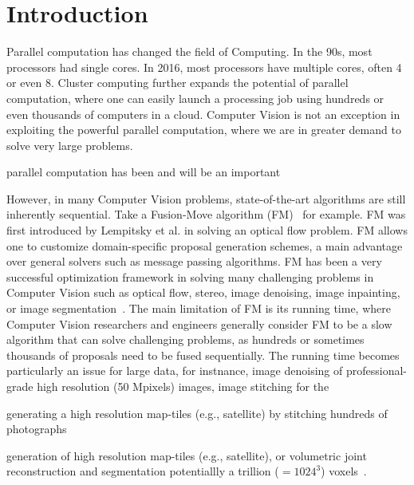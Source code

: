 \section{Introduction}
Parallel computation has changed the field of Computing.  In the 90s,
most processors had single cores. In 2016, most processors have multiple
cores, often 4 or even 8. Cluster computing further expands the
potential of parallel computation, where one can easily launch a
processing job using hundreds or even thousands of computers in a
cloud. Computer Vision is not an exception in exploiting the powerful
parallel computation, where we are in greater demand to solve very large
problems.




parallel computation has been and will be an important 


However, in many Computer Vision problems,
state-of-the-art algorithms are still inherently sequential. Take a
Fusion-Move algorithm (FM)~\cite{viktor,second_order_stereo,else} for
example. FM was first introduced by Lempitsky et al. in solving an
optical flow problem. FM allows one to customize domain-specific
proposal generation schemes, a main advantage over general solvers such
as message passing algorithms. FM has been a very successful
optimization framework in solving many challenging problems in Computer
Vision such as optical flow, stereo, image denoising, image inpainting,
or image
segmentation~\cite{fusion_moves_for_markov_random_field_optimization}. The
main limitation of FM is its running time, where Computer Vision
researchers and engineers generally consider FM to be a slow algorithm
that can solve challenging problems, as hundreds or sometimes thousands
of proposals need to be fused sequentially.
%
The running time becomes particularly an issue for large data, for
instnance, image denoising of professional-grade high resolution (50
Mpixels) images, image stitching for the

generating a high resolution map-tiles (e.g., satellite) by stitching
hundreds of photographs

generation of high resolution
map-tiles (e.g., satellite), or volumetric joint reconstruction and
segmentation potentiallly a trillion ($=1024^3$) voxels~\cite{Joint 3D
Scene Reconstruction and Class Segmentation}.

